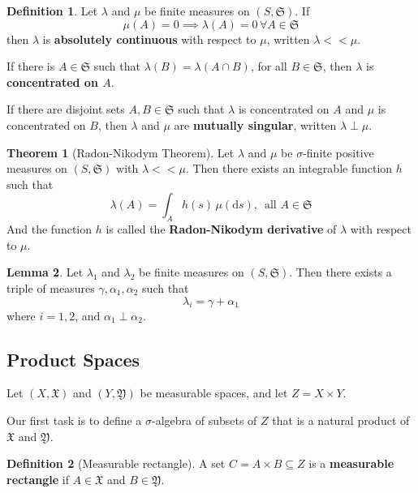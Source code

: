 \documentclass[12pt,a4paper]{article}
\theoremstyle{definition}
\newtheorem{theorem}{Theorem}[section]
\newtheorem{lemma}[theorem]{Lemma}
\newtheorem{definition}{Definition}[section]
\begin{document}
\begin{definition}
	Let $\lambda$ and $\mu$ be finite measures on $(S, \mathfrak{S})$. If
	\[
		\mu(A) = 0 \implies \lambda(A) = 0 \, \forall A \in \mathfrak{S}
	\]
	then $\lambda$ is \textbf{absolutely continuous} with respect to $\mu$, written $\lambda << \mu$. 

	If there is $A \in \mathfrak{S}$ such that $\lambda(B) = \lambda(A \cap B)$, for all $B \in \mathfrak{S}$, then $\lambda$ is \textbf{concentrated on $A$}.

	If there are disjoint sets $A, B \in \mathfrak{S}$ such that $\lambda$ is concentrated on $A$ and $\mu$ is concentrated on $B$, then $\lambda$ and $\mu$ are \textbf{mutually singular}, written $\lambda \perp \mu$.
\end{definition}

\begin{theorem}[Radon-Nikodym Theorem]
	Let $\lambda$ and $\mu$ be $\sigma$-finite positive measures on $(S, \mathfrak{S})$ with $\lambda << \mu$. Then there exists an integrable function $h$ such that
	\[
		\lambda(A) = \int_A h(s) \, \mu(\mathrm{d}s), \, \text{ all } A \in \mathfrak{S}
	\]
	And the function $h$ is called the \textbf{Radon-Nikodym derivative} of $\lambda$ with respect to $\mu$.
\end{theorem}

\begin{lemma}
	Let $\lambda_1$ and $\lambda_2$ be finite measures on $(S, \mathfrak{S})$. Then there exists a triple of measures $\gamma, \alpha_1, \alpha_2$ such that
	\[
		\lambda_i = \gamma + \alpha_1
	\]
	where $i = 1, 2$, and $\alpha_1 \perp \alpha_2$.
\end{lemma}

\subsection{Product Spaces}

Let $(X, \mathfrak{X})$ and $(Y, \mathfrak{Y})$ be measurable spaces, and let $Z = X \times Y$.

Our first task is to define a $\sigma$-algebra of subsets of $Z$ that is a natural product of $\mathfrak{X}$ and $\mathfrak{Y}$.

\begin{definition}[Measurable rectangle]
	A set $C = A \times B \subseteq Z$ is a \textbf{measurable rectangle} if $A \in \mathfrak{X}$ and $B \in \mathfrak{Y}$.
\end{definition}
\end{document}
